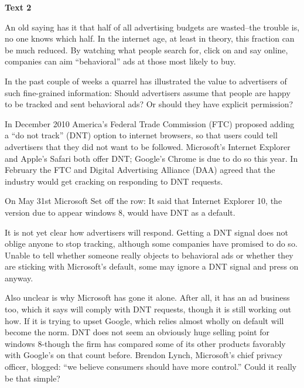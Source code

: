 \textbf{Text 2}

An old saying has it that half of all advertising budgets are wasted--the trouble is, no one knows which half. In the internet age, at least in theory, this fraction can be much reduced. By watching what people search for, click on and say online, companies can aim ``behavioral'' ads at those most likely to buy.

In the past couple of weeks a quarrel has illustrated the value to advertisers of such fine-grained information: Should advertisers assume that people are happy to be tracked and sent behavioral ads? Or should they have explicit permission?

In December 2010 America's Federal Trade Commission (FTC) proposed adding a ``do not track'' (DNT) option to internet browsers, so that users could tell advertisers that they did not want to be followed. Microsoft's Internet Explorer and Apple's Safari both offer DNT; Google's Chrome is due to do so this year. In February the FTC and Digital Advertising Alliance (DAA) agreed that the industry would get cracking on responding to DNT requests.

On May 31st Microsoft Set off the row: It said that Internet Explorer 10, the version due to appear windows 8, would have DNT as a default.

It is not yet clear how advertisers will respond. Getting a DNT signal does not oblige anyone to stop tracking, although some companies have promised to do so. Unable to tell whether someone really objects to behavioral ads or whether they are sticking with Microsoft’s default, some may ignore a DNT signal and press on anyway.

Also unclear is why Microsoft has gone it alone. After all, it has an ad business too, which it says will comply with DNT requests, though it is still working out how. If it is trying to upset Google, which relies almost wholly on default will become the norm. DNT does not seem an obviously huge selling point for windows 8-though the firm has compared some of its other products favorably with Google's on that count before. Brendon Lynch, Microsoft's chief privacy officer, blogged: ``we believe consumers should have more control.'' Could it really be that simple?

